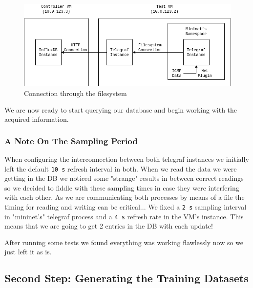\documentclass[12pt]{article}
\newcommand{\newpar} {
    \vskip 1cm
}
\begin{document}
			\begin{figure}
				\centering
				\includegraphics[width=\linewidth]{telegraf_connections.png}
				\caption{Connection through the filesystem}
				\label{f:telegraf_connections}
			\end{figure}

			We are now ready to start querying our database and begin working with the acquired information.

		\subsubsection{A Note On The Sampling Period}
			When configuring the interconnection between both telegraf instances we initially left the default \texttt{10 s} refresh interval in both. When we read the data we were getting in the DB we noticed some "strange" results in between correct readings so we decided to fiddle with these sampling times in case they were interfering with each other. As we are communicating both processes by means of a file the timing for reading and writing can be critical... We fixed a \texttt{2 s} sampling interval in "mininet's" telegraf process and a \texttt{4 s} refresh rate in the VM's instance. This means that we are going to get 2 entries in the DB with each update!
			\newpar
			After running some tests we found everything was working flawlessly now   so we just left it as is.

	\subsection{Second Step: Generating the Training Datasets}
\end{document}
